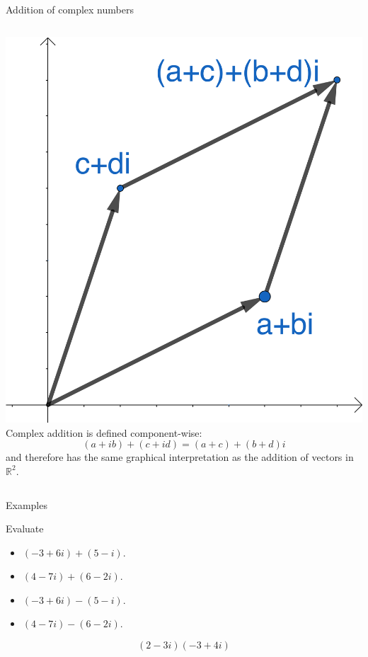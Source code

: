 \documentclass{beamer}
\begin{document}
\begin{frame}{Addition of complex numbers}
\begin{columns}
\includegraphics[scale=0.5]{complex-addition.png}
Complex addition is defined component-wise:
\begin{equation*}
(a+ib)+(c+id) = (a+c)+(b+d)i
\end{equation*}
and therefore has the same graphical interpretation as the addition of vectors in $\mathbb{R}^2$.
\end{columns}
\end{frame}

\begin{frame}{Examples}
\begin{example}
Evaluate
\begin{itemize}
\item $(-3+6i) + (5-i)$.
\item $(4-7i) + (6-2i)$.
\item $(-3+6i) - (5-i)$.
\item $(4-7i) - (6-2i)$.
\end{itemize}
\end{example}
\begin{example}
\begin{equation*} 
(2-3i)(-3+4i) 
\end{equation*}
\end{example}
\end{frame}
\end{document}
